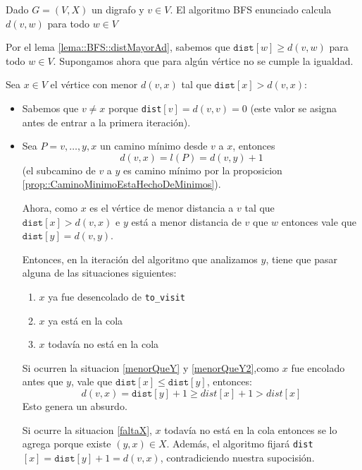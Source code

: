 \begin{theorem}
  Dado \(G=(V,X)\) un digrafo y \(v\in V\). El algoritmo BFS enunciado calcula \(d(v,w)\) para todo \(w\in V\)
\end{theorem}
\begin{demo}
  Por el lema \ref{lema::BFS::distMayorAd}, sabemos que \(\texttt{dist}[w]\geq d(v,w)\) para todo \(w\in V\). Supongamos ahora que para algún vértice no se cumple la igualdad.

  Sea \(x\in V\) el vértice con menor \(d(v,x)\) tal que \(\texttt{dist}[x] > d(v,x)\):
  \begin{itemize}
    \item Sabemos que \(v \neq x\) porque \texttt{dist}\([v] = d(v,v) = 0\) (este valor se asigna antes de entrar a la primera iteración).
    \item Sea \(P = v,\dots,y,x \) un camino mínimo desde \(v\) a \(x\), entonces
          \[d(v,x) = l(P) = d(v,y) + 1 \] (el subcamino de \(v\) a \(y\) es camino mínimo por la proposicion \ref{prop::CaminoMinimoEstaHechoDeMinimos}).

          Ahora, como \(x\) es el vértice de menor distancia a \(v\) tal que \(\texttt{dist}[x] > d(v,x)\) e \(y\) está a menor distancia de \(v\) que \(w\) entonces vale que \(\texttt{dist}[y] = d(v,y)\).

          Entonces, en la iteración del algoritmo que analizamos \(y\), tiene que pasar alguna de las situaciones siguientes:
          \begin{enumerate}
            \item \(x\) ya fue desencolado de \texttt{to\_visit}\label{menorQueY}
            \item \(x\) ya está en la cola\label{menorQueY2}
            \item \(x\) todavía no está en la cola \label{faltaX}
          \end{enumerate}

          Si ocurren la situacion \ref*{menorQueY} y \ref*{menorQueY2},como \(x\) fue encolado antes que \(y\), vale que \(\texttt{dist}[x] \leq \texttt{dist}[y] \), entonces:
          \[ d(v,x) = \texttt{dist}[y] + 1 \geq dist[x] + 1 > dist[x]\]
          Esto genera un absurdo.

          Si ocurre la situacion \ref*{faltaX}, \(x\) todavía no está en la cola entonces se lo agrega porque existe \((y,x) \in X\). Además, el algoritmo fijará \texttt{dist}\([x] = \texttt{dist}[y] + 1 = d(v,x)\), contradiciendo nuestra supocisión.
  \end{itemize}
\end{demo}


